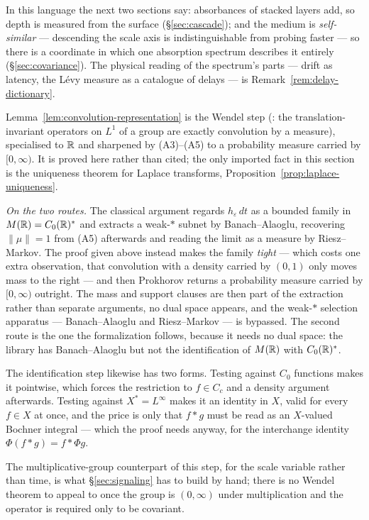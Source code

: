 \begin{remark}
In this language the next two sections say: absorbances of stacked layers add, so
depth is measured from the surface (\S\ref{sec:cascade}); and the medium is
\emph{self-similar} --- descending the scale axis is indistinguishable from probing
faster --- so there is a coordinate in which one absorption spectrum describes it
entirely (\S\ref{sec:covariance}). The physical reading of the spectrum's parts ---
drift as latency, the Lévy measure as a catalogue of delays --- is
Remark~\ref{rem:delay-dictionary}.
\end{remark}

\begin{remark}\label{rem:wendel}
Lemma~\ref{lem:convolution-representation} is the Wendel step
(: the translation-invariant operators on $L^1$ of a group are exactly
convolution by a measure), specialised to $\mathbb{R}$ and sharpened by (A3)--(A5) to a probability
measure carried by $[0,\infty)$. It is proved here rather than cited; the only imported
fact in this section is the uniqueness theorem for Laplace transforms,
Proposition~\ref{prop:laplace-uniqueness}.

\emph{On the two routes.} The classical argument regards $h_\varepsilon\,dt$ as a bounded
family in $M(\mathbb{R}) = C_0(\mathbb{R})^*$ and extracts a weak-$*$ subnet by Banach--Alaoglu, recovering
$\|\mu\| = 1$ from (A5) afterwards and reading the limit as a measure by Riesz--Markov. The
proof given above instead makes the family \emph{tight} --- which costs one extra observation,
that convolution with a density carried by $(0,1)$ only moves mass to the right --- and then
Prokhorov returns a probability measure carried by $[0,\infty)$ outright. The mass and support
clauses are then part of the extraction rather than separate arguments, no dual space appears,
and the weak-$*$ selection apparatus --- Banach--Alaoglu and Riesz--Markov --- is
bypassed. The second route is the one the formalization follows, because it needs no dual
space: the library has Banach--Alaoglu but not the identification of $M(\mathbb{R})$ with
$C_0(\mathbb{R})^*$.

The identification step likewise has two forms. Testing against $C_0$ functions makes it
pointwise, which forces the restriction to $f \in C_c$ and a density argument afterwards.
Testing against $X^* = L^\infty$ makes it an identity in $X$, valid for every $f \in X$ at
once, and the price is only that $f * g$ must be read as an $X$-valued Bochner integral --- which
the proof needs anyway, for the interchange identity $\Phi(f * g) = f * \Phi g$.

The multiplicative-group counterpart of this step, for the scale variable rather than time,
is what \S\ref{sec:signaling} has to build by hand; there is no Wendel theorem to appeal to
once the group is $(0,\infty)$ under multiplication and the operator is required only to be
covariant.
\end{remark}
